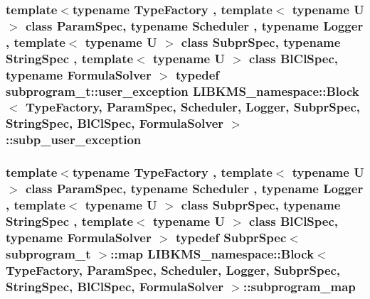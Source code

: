 \hypertarget{classLIBKMS__namespace_1_1Block_abd8589c23dd87cd24c96cf2d1a7c9d71}{
\subsubsection[{subp\-\_\-user\-\_\-exception}]{\setlength{\rightskip}{0pt plus 5cm}template$<$typename Type\-Factory , template$<$ typename U $>$ class Param\-Spec, typename Scheduler , typename Logger , template$<$ typename U $>$ class Subpr\-Spec, typename String\-Spec , template$<$ typename U $>$ class Bl\-Cl\-Spec, typename Formula\-Solver $>$ typedef {\bf subprogram\-\_\-t\-::user\-\_\-exception} {\bf L\-I\-B\-K\-M\-S\-\_\-namespace\-::\-Block}$<$ {\bf Type\-Factory}, Param\-Spec, Scheduler, Logger, Subpr\-Spec, String\-Spec, Bl\-Cl\-Spec, Formula\-Solver $>$\-::{\bf subp\-\_\-user\-\_\-exception}}}\label{classLIBKMS__namespace_1_1Block_abd8589c23dd87cd24c96cf2d1a7c9d71}
\hypertarget{classLIBKMS__namespace_1_1Block_af6ad7e673cbb2f16fe125605494e67fb}{
\subsubsection[{subprogram\-\_\-map}]{\setlength{\rightskip}{0pt plus 5cm}template$<$typename Type\-Factory , template$<$ typename U $>$ class Param\-Spec, typename Scheduler , typename Logger , template$<$ typename U $>$ class Subpr\-Spec, typename String\-Spec , template$<$ typename U $>$ class Bl\-Cl\-Spec, typename Formula\-Solver $>$ typedef Subpr\-Spec$<$ {\bf subprogram\-\_\-t} $>$\-::map {\bf L\-I\-B\-K\-M\-S\-\_\-namespace\-::\-Block}$<$ {\bf Type\-Factory}, Param\-Spec, Scheduler, Logger, Subpr\-Spec, String\-Spec, Bl\-Cl\-Spec, Formula\-Solver $>$\-::{\bf subprogram\-\_\-map}}}\label{classLIBKMS__namespace_1_1Block_af6ad7e673cbb2f16fe125605494e67fb}

